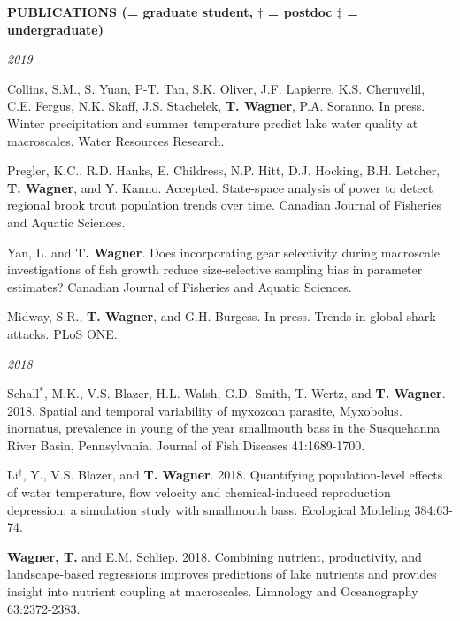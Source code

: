 \documentclass[10pt]{article}
\begin{document}
\begin{flushleft}
\vspace{8pt}
\centerline {\bf{PUBLICATIONS ({\small * = graduate student, $\dagger$ = postdoc $\ddagger$ = undergraduate})}}
\vspace{5pt}
\emph{2019}
\begin{etaremune}[start=85]
\item Collins, S.M., S. Yuan, P-T. Tan, S.K. Oliver, J.F. Lapierre, K.S. Cheruvelil, C.E. Fergus, N.K. Skaff, J.S. Stachelek, \textbf{T. Wagner}, P.A. Soranno. In press. Winter precipitation and summer temperature predict lake water quality at macroscales. Water Resources Research.
	
\item Pregler, K.C., R.D. Hanks, E. Childress, N.P. Hitt, D.J. Hocking, B.H. Letcher, \textbf{T. Wagner}, and Y. Kanno. Accepted. State-space analysis of power to detect regional brook trout population trends over time. Canadian Journal of Fisheries and Aquatic Sciences.

\item Yan, L. and \textbf{T. Wagner}. Does incorporating gear selectivity during macroscale investigations of fish growth reduce size-selective sampling bias in parameter estimates?	Canadian Journal of Fisheries and Aquatic Sciences.

\item Midway, S.R., \textbf{T. Wagner}, and G.H. Burgess. In press. Trends in global shark attacks. PLoS ONE.		

\end{etaremune}

\emph{2018}
\begin{etaremune}[start=81]
\item Schall$^*$, M.K., V.S. Blazer, H.L. Walsh, G.D. Smith, T. Wertz, and \textbf{T. Wagner}. 2018. Spatial and temporal variability of myxozoan parasite, Myxobolus. inornatus, prevalence in young of the year smallmouth bass in the Susquehanna River Basin, Pennsylvania. Journal of Fish Diseases 41:1689-1700.

\item Li$^\dagger$, Y., V.S. Blazer, and \textbf{T. Wagner}. 2018. Quantifying population-level effects of water temperature, flow velocity and chemical-induced reproduction depression: a simulation study with smallmouth bass. Ecological Modeling 384:63-74.

\item {\bf Wagner, T.} and E.M. Schliep. 2018. Combining nutrient, productivity, and landscape-based regressions improves predictions of lake nutrients and provides insight into nutrient coupling at macroscales. Limnology and Oceanography 63:2372-2383.


\end{etaremune}
\end{flushleft}
\end{document}
